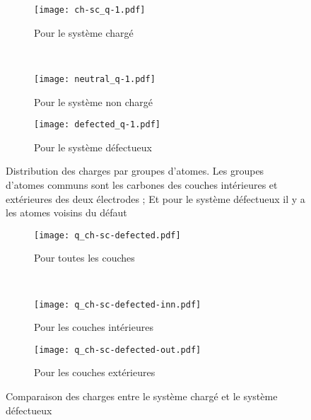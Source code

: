 \begin{figure}[h!]
    \centering
    \begin{subfigure}[t]{.49 \textwidth}
        \centering
        \texttt{[image: ch-sc\_q-1.pdf]}
        \caption{Pour le système chargé}
        \label{fig:charges_groupes_ch-sc}
    \end{subfigure}%
    ~
    \begin{subfigure}[t]{.49 \textwidth}
        \centering
        \texttt{[image: neutral\_q-1.pdf]}
        \caption{Pour le système non chargé}
        \label{fig:charges_groupes_neutral}
    \end{subfigure}
    
    \begin{subfigure}[t]{.49 \textwidth}
        \centering
        \texttt{[image: defected\_q-1.pdf]}
        \caption{Pour le système défectueux}
        \label{fig:charges_groupes_defected}
    \end{subfigure}

    \caption{Distribution des charges par groupes d'atomes. Les groupes d'atomes communs sont les carbones des couches intérieures et extérieures des deux électrodes ; Et pour le système défectueux il y a les atomes voisins du défaut}
    \label{fig:charges_groupes}
\end{figure}

\begin{figure}[h!]
    \centering
    \begin{subfigure}[t]{.49 \textwidth}
        \centering
        \texttt{[image: q\_ch-sc-defected.pdf]}
        \caption{Pour toutes les couches}
    \end{subfigure}%
    ~
    \begin{subfigure}[t]{.49 \textwidth}
        \centering
        \texttt{[image: q\_ch-sc-defected-inn.pdf]}
        \caption{Pour les couches intérieures}
    \end{subfigure}

    \begin{subfigure}[t]{.49 \textwidth}
        \centering
        \texttt{[image: q\_ch-sc-defected-out.pdf]}
        \caption{Pour les couches extérieures}
    \end{subfigure}
    \caption{Comparaison des charges entre le système chargé et le système défectueux}
    \label{fig:comparaison_ch-sc-defected}
\end{figure}

